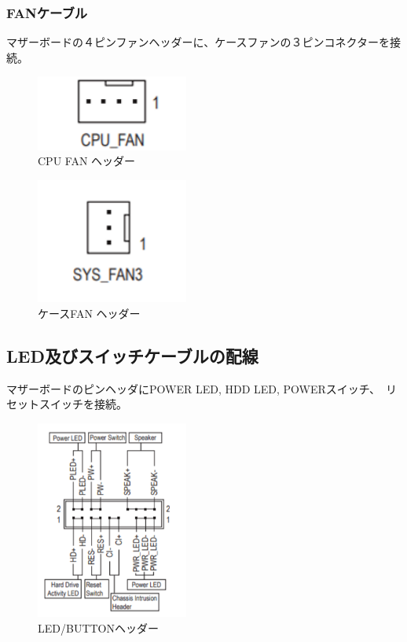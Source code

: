 \documentclass[10pt]{article}
\begin{document}
\subsubsection{FANケーブル}
\hspace{1cm}マザーボードの４ピンファンヘッダーに、ケースファンの３ピンコネクターを接続。

\begin{figure}[H]
	\centering
	\includegraphics[width=5cm]{CPUFAN.png}
	\caption{CPU FAN ヘッダー}
	
\end{figure}

\begin{figure}[H]
	\centering
	\includegraphics[width=5cm]{SYSFAN.png}
	\caption{ケースFAN ヘッダー}
	
\end{figure}

\subsection{LED及びスイッチケーブルの配線}
\hspace{1cm}マザーボードのピンヘッダにPOWER LED, HDD LED, POWERスイッチ、　リセットスイッチを接続。

\begin{figure}[H]
	\centering
	\includegraphics[width=5cm]{FRONT.png}
	\caption{LED/BUTTONヘッダー}
	
\end{figure}
\end{document}
